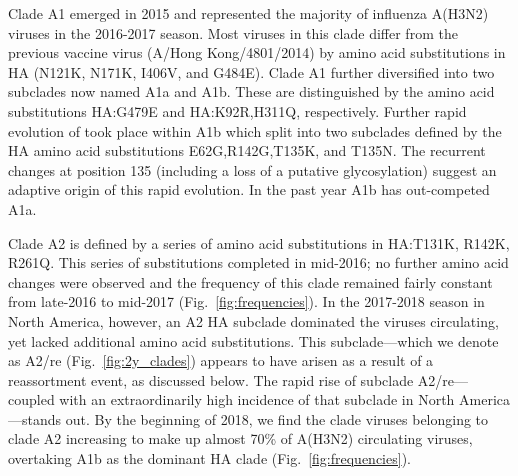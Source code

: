 Clade A1 emerged in 2015 and represented the majority of influenza A(H3N2) viruses in the 2016-2017 season.
Most viruses in this clade differ from the previous vaccine virus (A/Hong Kong/4801/2014) by amino acid substitutions in HA (N121K, N171K, I406V, and G484E).
Clade A1 further diversified into two subclades now named A1a and A1b.
These are distinguished by the amino acid substitutions HA:G479E and HA:K92R,H311Q, respectively.
Further rapid evolution of took place within A1b which split into two subclades defined by the HA amino acid substitutions E62G,R142G,T135K, and T135N.
The recurrent changes at position 135 (including a loss of a putative glycosylation) suggest an adaptive origin of this rapid evolution.
In the past year A1b has out-competed A1a.

Clade A2 is defined by a series of amino acid substitutions in HA:T131K, R142K, R261Q.
This series of substitutions completed in mid-2016; no further amino acid changes were observed and the frequency of this clade remained fairly constant from late-2016 to mid-2017 (Fig.~\ref{fig:frequencies}).
In the 2017-2018 season in North America, however, an A2 HA subclade dominated the viruses circulating, yet lacked additional amino acid substitutions.
This subclade—which we denote as A2/re (Fig.~\ref{fig:2y_clades}) appears to have arisen as a result of a reassortment event, as discussed below.
The rapid rise of subclade A2/re---coupled with an extraordinarily high incidence of that subclade in North America---stands out.
By the beginning of 2018, we find the clade viruses belonging to clade A2 increasing to make up almost 70\% of A(H3N2) circulating viruses, overtaking A1b as the dominant HA clade (Fig.~\ref{fig:frequencies}).

